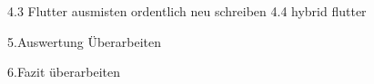 
4.3 Flutter
ausmisten
ordentlich neu schreiben
4.4 hybrid flutter

5.Auswertung
Überarbeiten

6.Fazit
überarbeiten
